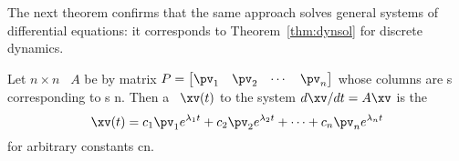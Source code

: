 The next theorem confirms that the same approach solves general systems of differential equations: it corresponds to Theorem~\ref{thm:dynsol} for discrete dynamics.



\begin{theorem} \label{thm:ddtsol}
Let \(n\times n\) ~\(A\) be  by matrix \(P=\begin{bmatrix} \pv_1&\pv_2&\cdots&\pv_n \end{bmatrix}\) whose columns are s corresponding to s \hlist\lambda n.  
Then a ~\(\xv(t)\) to the  system \(d\xv/dt=A\xv\) is the 
\begin{equation}
\xv(t)=c_1\pv_1e^{\lambda_1t}+c_2\pv_2e^{\lambda_2t}+\cdots+c_n\pv_ne^{\lambda_nt}
\label{eq:ddtsol}
\end{equation}
for arbitrary constants \hlist cn.
\end{theorem}

